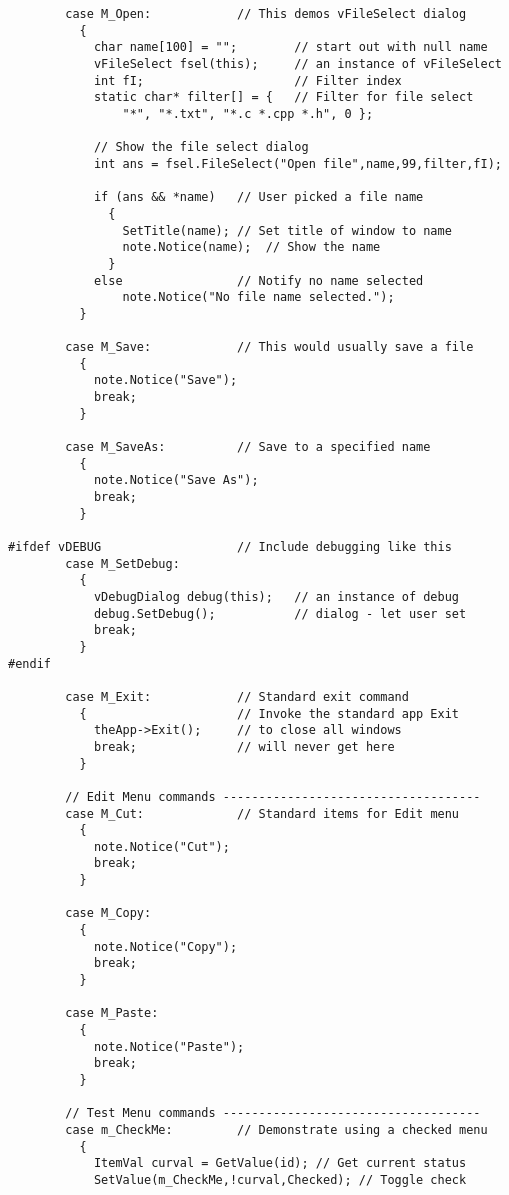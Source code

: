 \begin{verbatim}
        case M_Open:            // This demos vFileSelect dialog
          {
            char name[100] = "";        // start out with null name
            vFileSelect fsel(this);     // an instance of vFileSelect
            int fI;                     // Filter index
            static char* filter[] = {   // Filter for file select
                "*", "*.txt", "*.c *.cpp *.h", 0 };

            // Show the file select dialog
            int ans = fsel.FileSelect("Open file",name,99,filter,fI);

            if (ans && *name)   // User picked a file name
              {
                SetTitle(name); // Set title of window to name
                note.Notice(name);  // Show the name
              }
            else                // Notify no name selected
                note.Notice("No file name selected.");
          }

        case M_Save:            // This would usually save a file
          {
            note.Notice("Save");
            break;
          }

        case M_SaveAs:          // Save to a specified name
          {
            note.Notice("Save As");
            break;
          }

#ifdef vDEBUG                   // Include debugging like this
        case M_SetDebug:
          {
            vDebugDialog debug(this);   // an instance of debug 
            debug.SetDebug();           // dialog - let user set
            break;
          }
#endif

        case M_Exit:            // Standard exit command
          {                     // Invoke the standard app Exit
            theApp->Exit();     // to close all windows
            break;              // will never get here
          }

        // Edit Menu commands ------------------------------------
        case M_Cut:             // Standard items for Edit menu
          {
            note.Notice("Cut");
            break;
          }

        case M_Copy:
          {
            note.Notice("Copy");
            break;
          }

        case M_Paste:
          {
            note.Notice("Paste");
            break;
          }

        // Test Menu commands ------------------------------------
        case m_CheckMe:         // Demonstrate using a checked menu
          {
            ItemVal curval = GetValue(id); // Get current status
            SetValue(m_CheckMe,!curval,Checked); // Toggle check


\end{verbatim}
